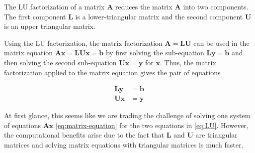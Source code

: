 \documentclass[
]{book}
\theoremstyle{definition}
\theoremstyle{definition}
\theoremstyle{definition}
\theoremstyle{remark}
\begin{document}
The LU factorization of a matrix \(\mathbf{A}\) reduces the matrix \(\mathbf{A}\) into two components. The first component \(\mathbf{L}\) is a lower-triangular matrix and the second component \(\mathbf{U}\) is an upper triangular matrix.

Using the LU factorization, the matrix factorization \(\mathbf{A} = \mathbf{L} \mathbf{U}\) can be used in the matrix equation \(\mathbf{A} \mathbf{x} = \mathbf{L} \mathbf{U}\mathbf{x} = \mathbf{b}\) by first solving the sub-equation \(\mathbf{L} \mathbf{y} = \mathbf{b}\) and then solving the second sub-equation \(\mathbf{U} \mathbf{x} = \mathbf{y}\) for \(\mathbf{x}\). Thus, the matrix factorization applied to the matrix equation gives the pair of equations

\[
\begin{aligned}
\mathbf{L} \mathbf{y} & = \mathbf{b} \\
\mathbf{U} \mathbf{x} & = \mathbf{y}
\end{aligned}
\label{eq:LU}
\]

At first glance, this seems like we are trading the challenge of solving one system of equations \(\mathbf{A}\mathbf{x}\) \eqref{eq:matrix-equation} for the two equations in \eqref{eq:LU}. However, the computational benefits arise due to the fact that \(\mathbf{L}\) and \(\mathbf{U}\) are triangular matrices and solving matrix equations with triangular matrices is much faster.
\end{document}
